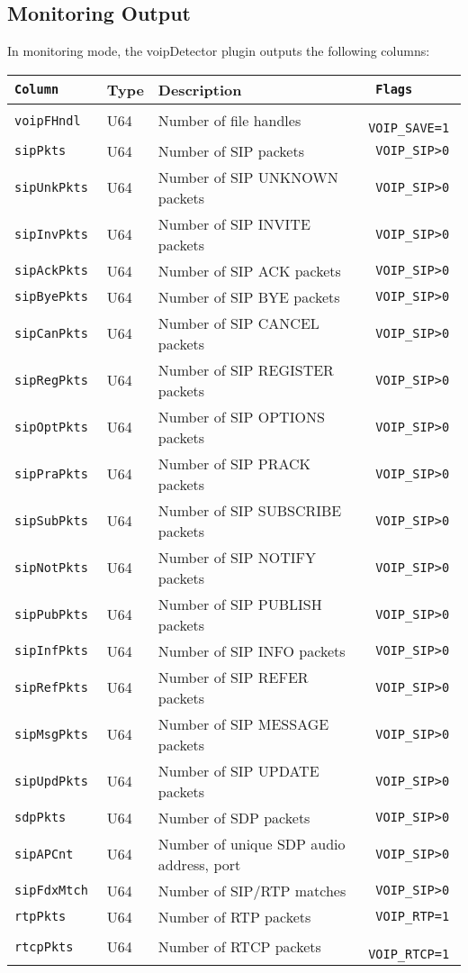 \documentclass[documentation]{subfiles}
\begin{document}
\subsection{Monitoring Output}
In monitoring mode, the voipDetector plugin outputs the following columns:
\begin{longtable}{>{\tt}lll>{\tt\small}l}
    \toprule
    {\bf Column} & {\bf Type} & {\bf Description} & {\bf Flags}\\
    \midrule\endhead%
    voipFHndl  & U64 & Number of file handles                   & VOIP\_SAVE=1\\
    sipPkts    & U64 & Number of SIP packets                    & VOIP\_SIP>0 \\
    sipUnkPkts & U64 & Number of SIP UNKNOWN packets            & VOIP\_SIP>0 \\
    sipInvPkts & U64 & Number of SIP INVITE packets             & VOIP\_SIP>0 \\
    sipAckPkts & U64 & Number of SIP ACK packets                & VOIP\_SIP>0 \\
    sipByePkts & U64 & Number of SIP BYE packets                & VOIP\_SIP>0 \\
    sipCanPkts & U64 & Number of SIP CANCEL packets             & VOIP\_SIP>0 \\
    sipRegPkts & U64 & Number of SIP REGISTER packets           & VOIP\_SIP>0 \\
    sipOptPkts & U64 & Number of SIP OPTIONS packets            & VOIP\_SIP>0 \\
    sipPraPkts & U64 & Number of SIP PRACK packets              & VOIP\_SIP>0 \\
    sipSubPkts & U64 & Number of SIP SUBSCRIBE packets          & VOIP\_SIP>0 \\
    sipNotPkts & U64 & Number of SIP NOTIFY packets             & VOIP\_SIP>0 \\
    sipPubPkts & U64 & Number of SIP PUBLISH packets            & VOIP\_SIP>0 \\
    sipInfPkts & U64 & Number of SIP INFO packets               & VOIP\_SIP>0 \\
    sipRefPkts & U64 & Number of SIP REFER packets              & VOIP\_SIP>0 \\
    sipMsgPkts & U64 & Number of SIP MESSAGE packets            & VOIP\_SIP>0 \\
    sipUpdPkts & U64 & Number of SIP UPDATE packets             & VOIP\_SIP>0 \\
    sdpPkts    & U64 & Number of SDP packets                    & VOIP\_SIP>0 \\
    sipAPCnt   & U64 & Number of unique SDP audio address, port & VOIP\_SIP>0 \\
    sipFdxMtch & U64 & Number of SIP/RTP matches                & VOIP\_SIP>0\\
    rtpPkts    & U64 & Number of RTP packets                    & VOIP\_RTP=1 \\
    rtcpPkts   & U64 & Number of RTCP packets                   & VOIP\_RTCP=1\\
    \bottomrule
\end{longtable}
\end{document}

